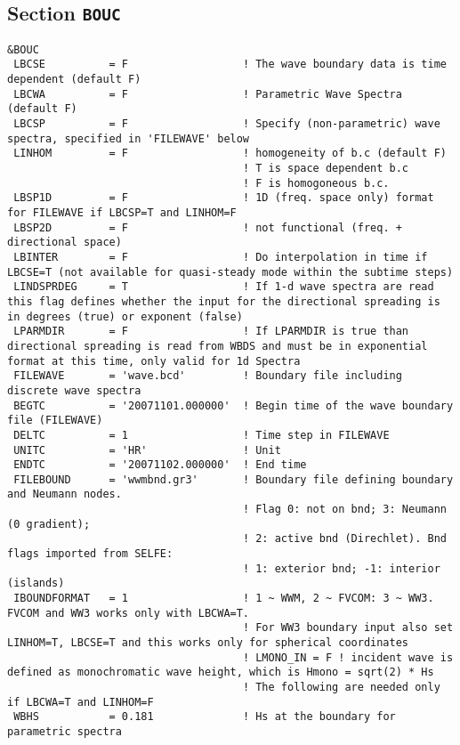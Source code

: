 \documentclass[12pt]{amsart}
\begin{document}
\subsection{Section {\tt BOUC}}

\begin{verbatim}
&BOUC
 LBCSE          = F                  ! The wave boundary data is time dependent (default F)
 LBCWA          = F                  ! Parametric Wave Spectra (default F)
 LBCSP          = F                  ! Specify (non-parametric) wave spectra, specified in 'FILEWAVE' below
 LINHOM         = F                  ! homogeneity of b.c (default F)
                                     ! T is space dependent b.c
                                     ! F is homogoneous b.c.
 LBSP1D         = F                  ! 1D (freq. space only) format for FILEWAVE if LBCSP=T and LINHOM=F
 LBSP2D         = F                  ! not functional (freq. + directional space)
 LBINTER        = F                  ! Do interpolation in time if LBCSE=T (not available for quasi-steady mode within the subtime steps)
 LINDSPRDEG     = T                  ! If 1-d wave spectra are read this flag defines whether the input for the directional spreading is in degrees (true) or exponent (false)
 LPARMDIR       = F                  ! If LPARMDIR is true than directional spreading is read from WBDS and must be in exponential format at this time, only valid for 1d Spectra
 FILEWAVE       = 'wave.bcd'         ! Boundary file including discrete wave spectra
 BEGTC          = '20071101.000000'  ! Begin time of the wave boundary file (FILEWAVE)
 DELTC          = 1                  ! Time step in FILEWAVE
 UNITC          = 'HR'               ! Unit
 ENDTC          = '20071102.000000'  ! End time
 FILEBOUND      = 'wwmbnd.gr3'       ! Boundary file defining boundary and Neumann nodes.
                                     ! Flag 0: not on bnd; 3: Neumann (0 gradient);
                                     ! 2: active bnd (Direchlet). Bnd flags imported from SELFE:
                                     ! 1: exterior bnd; -1: interior (islands)
 IBOUNDFORMAT   = 1                  ! 1 ~ WWM, 2 ~ FVCOM: 3 ~ WW3. FVCOM and WW3 works only with LBCWA=T.
                                     ! For WW3 boundary input also set LINHOM=T, LBCSE=T and this works only for spherical coordinates
                                     ! LMONO_IN = F ! incident wave is defined as monochromatic wave height, which is Hmono = sqrt(2) * Hs
                                     ! The following are needed only if LBCWA=T and LINHOM=F
 WBHS           = 0.181              ! Hs at the boundary for parametric spectra

\end{verbatim}
\end{document}
